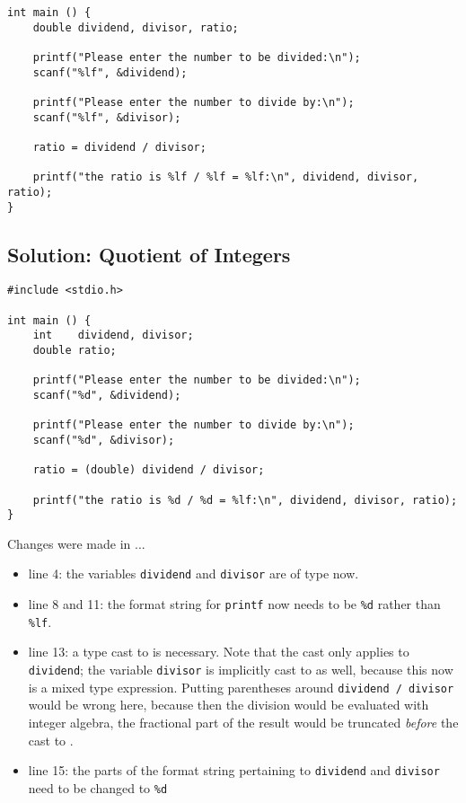 {\begin{codebox}[exo4-1.c]
\begin{verbatim}
int main () {
    double dividend, divisor, ratio;
    
    printf("Please enter the number to be divided:\n");
    scanf("%lf", &dividend);
    
    printf("Please enter the number to divide by:\n");
    scanf("%lf", &divisor);
    
    ratio = dividend / divisor;
    
    printf("the ratio is %lf / %lf = %lf:\n", dividend, divisor, ratio);
}
\end{verbatim}
\end{codebox}


\subsection*{Solution: Quotient of Integers}
\begin{codebox}[exo4-2.c]
\begin{verbatim}
#include <stdio.h>

int main () {
    int    dividend, divisor;
    double ratio;
    
    printf("Please enter the number to be divided:\n");
    scanf("%d", &dividend);
    
    printf("Please enter the number to divide by:\n");
    scanf("%d", &divisor);
    
    ratio = (double) dividend / divisor;
    
    printf("the ratio is %d / %d = %lf:\n", dividend, divisor, ratio);
}
\end{verbatim}
\end{codebox}

Changes were made in ...
\begin{itemize}
\item line 4: the variables \texttt{dividend} and \texttt{divisor} are of type  now.
\item line 8 and 11: the format string for \texttt{printf} now needs to be \texttt{\%d} rather than \texttt{\%lf}.
\item line 13: a type cast to  is necessary. Note that the cast only applies to \texttt{dividend};
	the variable \texttt{divisor} is implicitly cast to  as well, because this now is a mixed type expression.
	Putting parentheses around \texttt{dividend / divisor} would be wrong here, because then the division would be evaluated with integer algebra, 
	\ie the fractional part of the result would be truncated \emph{before} the cast to .
\item line 15: the parts of the format string pertaining to \texttt{dividend} and \texttt{divisor} need to be changed to \texttt{\%d}
\end{itemize}
\vfill

}
